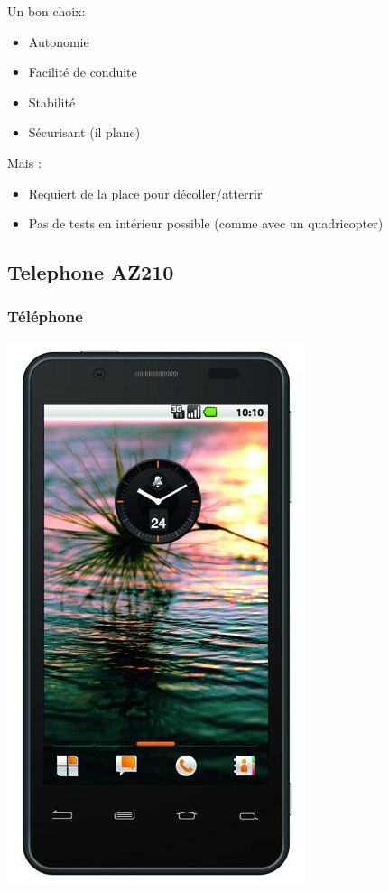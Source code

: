 \documentclass[transparent]{beamer}
\begin{document}
\begin{frame}
	\begin{block}{Un bon choix:}
			\begin{itemize}
				\item Autonomie
				\item Facilité de conduite
				\item Stabilité
				\item Sécurisant (il plane)
			\end{itemize}
	\end{block}
	\begin{block}{Mais :}
			\begin{itemize}
				\item Requiert de la place pour décoller/atterrir
				\item Pas de tests en intérieur possible (comme avec un quadricopter)
			\end{itemize}
	\end{block}
\end{frame}


\subsection{Telephone AZ210}

\begin{frame}
	\frametitle{Téléphone}
	\begin{center}
 	\includegraphics[height=0.8\textheight]{images/telephone.png} 
	\end{center}

\end{frame}
\end{document}

